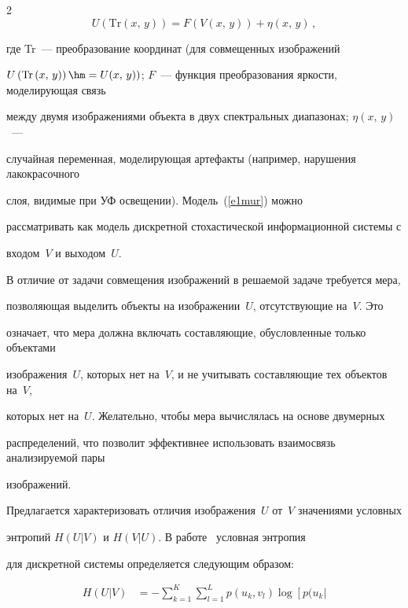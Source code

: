 \begin{multicols}{2}
\begin{equation}
  U\left(\mathrm{Tr}\left(x,\,y\right)\right) =F(V(x,\,y))+\eta(x,\,y)\,,


  \label{e1mur}


  \end{equation}


где Tr~--- преобразование координат (для совмещенных изображений 


$U\left(\mathrm{Tr}\left(x,\,y\right)\right)\hm=U(x,\,y))$; $F$~--- функция преобразования яркости, моделирующая связь 


между двумя изображениями объекта в двух спектральных диапазонах; $\eta(x,\,y)$~--- 


случайная переменная, моделирующая артефакты (например, нарушения лакокрасочного 


слоя, видимые при УФ освещении). Модель~(\ref{e1mur}) можно 


рассматривать как модель дискретной стохастической информационной системы с 


входом~$V$ и выходом~$U$. 


  


  В отличие от задачи совмещения изображений в решаемой задаче требуется мера, 


позволяющая выделить объекты на изображении~$U$, от\-сут\-ст\-ву\-ющие на~$V$. Это 


означает, что мера должна включать составляющие, обусловленные только объектами 


изображения~$U$, которых нет на~$V$, и не учитывать составляющие тех объектов на~$V$, 


которых нет на~$U$. Желательно, чтобы мера вычислялась на основе двумерных 


распределений, что позволит эффективнее использовать взаимосвязь анализируемой пары 


изображений.


  


  Предлагается характеризовать отличия изображения~$U$ от~$V$ значениями условных 


энтропий $H(U\vert V)$ и $H(V\vert U)$. В работе~\cite{14mur} условная энтропия 


для дискретной системы определяется следующим образом:


  \begin{align}


  H(U\vert V) &= -\sum\limits_{k=1}^K \sum\limits_{l=1}^L p(u_k,v_l)\log \left[ p(u_k\vert 



\end{align}
\end{multicols}
